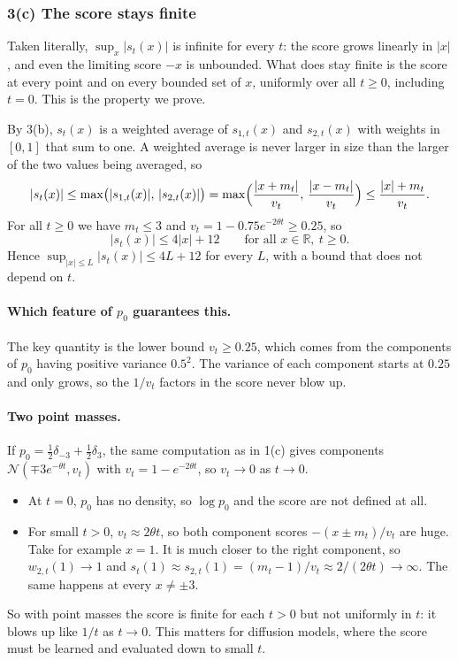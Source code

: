 \documentclass[11pt]{article}
\newcommand{\N}{\mathcal{N}}
\begin{document}
\subsubsection*{3(c) The score stays finite}

Taken literally, $\sup_x|s_t(x)|$ is infinite for every $t$: the score grows linearly in $|x|$, and even the limiting
score $-x$ is unbounded. What does stay finite is the score at every point and on every bounded set of $x$,
uniformly over all $t\ge0$, including $t=0$. This is the property we prove.

By 3(b), $s_t(x)$ is a weighted average of $s_{1,t}(x)$ and $s_{2,t}(x)$ with weights in $[0,1]$ that sum to one. A weighted
average is never larger in size than the larger of the two values being averaged, so
\[
|s_t(x)| \le \max\bigl(|s_{1,t}(x)|,\,|s_{2,t}(x)|\bigr) = \max\Bigl(\frac{|x+m_t|}{v_t},\,\frac{|x-m_t|}{v_t}\Bigr) \le \frac{|x| + m_t}{v_t}.
\]
For all $t\ge0$ we have $m_t\le3$ and $v_t = 1 - 0.75e^{-2\theta t}\ge 0.25$, so
\[
|s_t(x)| \le 4|x| + 12 \qquad\text{for all } x\in\mathbb R,\ t\ge0 .
\]
Hence $\sup_{|x|\le L}|s_t(x)| \le 4L + 12$ for every $L$, with a bound that does not depend on $t$.

\paragraph{Which feature of $p_0$ guarantees this.} The key quantity is the lower bound $v_t\ge 0.25$, which comes
from the components of $p_0$ having positive variance $0.5^2$. The variance of each component starts at $0.25$
and only grows, so the $1/v_t$ factors in the score never blow up.

\paragraph{Two point masses.} If $p_0 = \tfrac12\delta_{-3}+\tfrac12\delta_{3}$, the same computation as in 1(c) gives
components $\N(\mp3e^{-\theta t}, v_t)$ with $v_t = 1-e^{-2\theta t}$, so $v_t\to0$ as $t\to0$.
\begin{itemize}
\item At $t=0$, $p_0$ has no density, so $\log p_0$ and the score are not defined at all.
\item For small $t>0$, $v_t\approx 2\theta t$, so both component scores $-(x\pm m_t)/v_t$ are huge. Take for example $x=1$.
It is much closer to the right component, so $w_{2,t}(1)\to1$ and $s_t(1)\approx s_{2,t}(1) = (m_t-1)/v_t\approx 2/(2\theta t)\to\infty$.
The same happens at every $x\ne\pm3$.
\end{itemize}
So with point masses the score is finite for each $t>0$ but not uniformly in $t$: it blows up like $1/t$ as $t\to0$. This
matters for diffusion models, where the score must be learned and evaluated down to small $t$.
\end{document}
